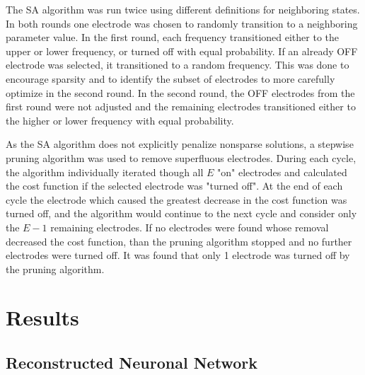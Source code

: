 \documentclass[11pt,a4paper,final]{article}
\begin{document}
The SA algorithm was run twice using different definitions for neighboring states.
In both rounds one electrode was chosen to randomly transition to a neighboring parameter value.
In the first round, each frequency transitioned either to the upper or lower  frequency, or turned off with equal probability.
If an already OFF electrode was selected, it transitioned to a random frequency.
This was done to encourage sparsity and to identify the subset of electrodes to more carefully optimize in the second round.
In the second round, the OFF electrodes from the first round were not adjusted and the remaining electrodes transitioned either to the higher or lower frequency with equal probability.

As the SA algorithm does not explicitly penalize nonsparse solutions, a stepwise pruning algorithm was used to remove superfluous electrodes.
During each cycle, the algorithm individually iterated though all $E$ "on" electrodes and calculated the cost function if the selected electrode was "turned off".
At the end of each cycle the electrode which caused the greatest decrease in the cost function was turned off, and the algorithm would continue to the next cycle and consider only the $E-1$ remaining electrodes.
If no electrodes were found whose removal decreased the cost function, than the pruning algorithm stopped and no further electrodes were turned off.
It was found that only 1 electrode was turned off by the pruning algorithm.


\section{Results \label{results}}

    \subsection{Reconstructed Neuronal Network}
\end{document}
